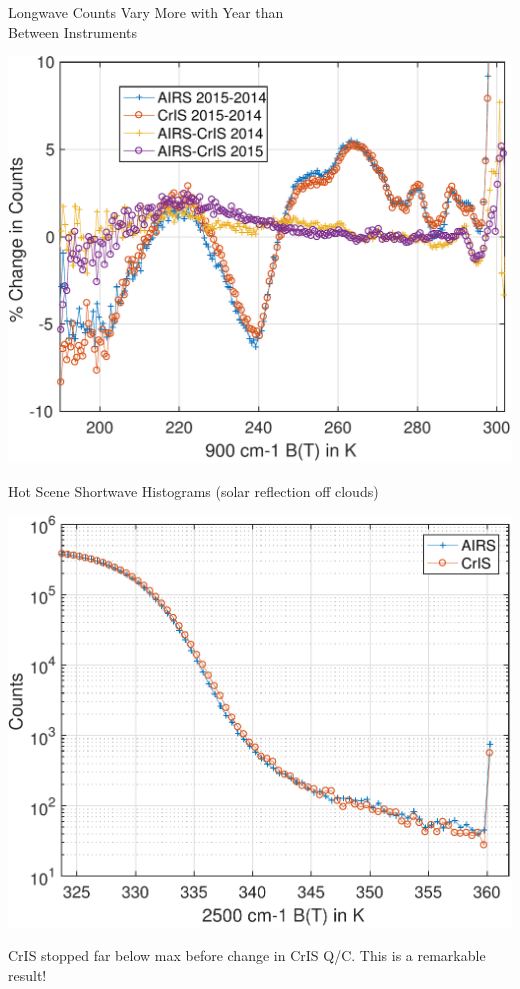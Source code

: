 \documentclass[10pt,t]{beamer}
\begin{document}
\begin{frame}[label={sec:orgf21917b}]{Longwave Counts Vary More with Year than \\Between Instruments}
\begin{center}
\includegraphics[width=0.8\linewidth]{./Figs/Pdf/ocean_percent_count_changes.pdf}
\end{center}
\end{frame}

\begin{frame}[label={sec:org86b7c90}]{Hot Scene Shortwave Histograms (solar reflection off clouds)}
\begin{center}
\includegraphics[width=0.7\linewidth]{./Figs/Pdf/global_sw_counts_bt325plus.pdf}
\end{center}
\vspace{-0.05in}
\small
CrIS stopped far below max before change in CrIS Q/C.  This is a remarkable
result!
\end{frame}
\end{document}
